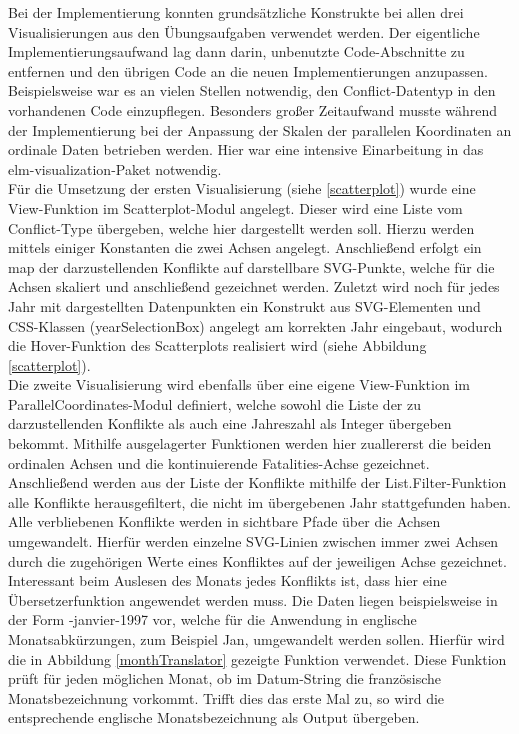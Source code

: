 \documentclass[usegeometry=true]{scrartcl}
\begin{document}
Bei der Implementierung konnten grundsätzliche Konstrukte bei allen drei Visualisierungen aus den Übungsaufgaben verwendet werden. Der eigentliche Implementierungsaufwand lag dann darin, unbenutzte Code-Abschnitte zu entfernen und den übrigen Code an die neuen Implementierungen anzupassen. Beispielsweise war es an vielen Stellen notwendig, den Conflict-Datentyp in den vorhandenen Code einzupflegen. Besonders großer Zeitaufwand musste während der Implementierung bei der Anpassung der Skalen der parallelen Koordinaten an ordinale Daten betrieben werden. Hier war eine intensive Einarbeitung in das elm-visualization-Paket \cite{elm-vis} notwendig.\\

Für die Umsetzung der ersten Visualisierung (siehe \ref{scatterplot}) wurde eine View-Funktion im Scatterplot-Modul angelegt. Dieser wird eine Liste vom Conflict-Type übergeben, welche hier dargestellt werden soll. Hierzu werden mittels einiger Konstanten die zwei Achsen angelegt. Anschließend erfolgt ein map der darzustellenden Konflikte auf darstellbare SVG-Punkte, welche für die Achsen skaliert und anschließend gezeichnet werden. Zuletzt wird noch für jedes Jahr mit dargestellten Datenpunkten ein Konstrukt aus SVG-Elementen und CSS-Klassen (\glqq yearSelectionBox\grqq) angelegt am korrekten Jahr eingebaut, wodurch die Hover-Funktion des Scatterplots realisiert wird (siehe Abbildung \ref{scatterplot}).\\

Die zweite Visualisierung wird ebenfalls über eine eigene View-Funktion im ParallelCoordinates-Modul definiert, welche sowohl die Liste der zu darzustellenden Konflikte als auch eine Jahreszahl als Integer übergeben bekommt. Mithilfe ausgelagerter Funktionen werden hier zuallererst die beiden ordinalen Achsen und die kontinuierende \glqq Fatalities\grqq-Achse gezeichnet. Anschließend werden aus der Liste der Konflikte mithilfe der List.Filter-Funktion alle Konflikte herausgefiltert, die nicht im übergebenen Jahr stattgefunden haben. Alle verbliebenen Konflikte werden in sichtbare Pfade über die Achsen umgewandelt. Hierfür werden einzelne SVG-Linien zwischen immer zwei Achsen durch die zugehörigen Werte eines Konfliktes auf der jeweiligen Achse gezeichnet.\\ Interessant beim Auslesen des Monats jedes Konflikts ist, dass hier eine Übersetzerfunktion angewendet werden muss. Die Daten liegen beispielsweise in der Form -janvier-1997\grqq{} vor, welche für die Anwendung in englische Monatsabkürzungen, zum Beispiel \glqq Jan\grqq, umgewandelt werden sollen. Hierfür wird die in Abbildung \ref{monthTranslator} gezeigte Funktion verwendet. Diese Funktion prüft für jeden möglichen Monat, ob im Datum-String die französische Monatsbezeichnung vorkommt. Trifft dies das erste Mal zu, so wird die entsprechende englische Monatsbezeichnung als Output übergeben.\\
\end{document}
